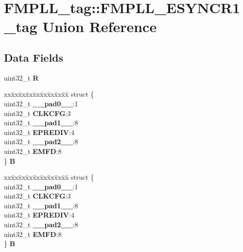\hypertarget{unionFMPLL__tag_1_1FMPLL__ESYNCR1__tag}{}\section{F\+M\+P\+L\+L\+\_\+tag\+::F\+M\+P\+L\+L\+\_\+\+E\+S\+Y\+N\+C\+R1\+\_\+tag Union Reference}
\label{unionFMPLL__tag_1_1FMPLL__ESYNCR1__tag}
\subsection*{Data Fields}
\begin{DoxyCompactItemize}
\item 
\mbox{\label{unionFMPLL__tag_1_1FMPLL__ESYNCR1__tag_ad4d5de477dfd2d4762adf998c3401622}} 
uint32\+\_\+t {\bfseries R}
\item 
\mbox{\label{unionFMPLL__tag_1_1FMPLL__ESYNCR1__tag_a9950e2684cd73183cee74c74d6430e35}} 
\begin{tabbing}
xx\=xx\=xx\=xx\=xx\=xx\=xx\=xx\=xx\=\kill
struct \{\\
\>uint32\_t {\bfseries \_\_pad0\_\_}:1\\
\>uint32\_t {\bfseries CLKCFG}:3\\
\>uint32\_t {\bfseries \_\_pad1\_\_}:8\\
\>uint32\_t {\bfseries EPREDIV}:4\\
\>uint32\_t {\bfseries \_\_pad2\_\_}:8\\
\>uint32\_t {\bfseries EMFD}:8\\
\} {\bfseries B}\\

\end{tabbing}\item 
\mbox{\label{unionFMPLL__tag_1_1FMPLL__ESYNCR1__tag_afdf7cc3e1c4dffbcdd849649b589d417}} 
\begin{tabbing}
xx\=xx\=xx\=xx\=xx\=xx\=xx\=xx\=xx\=\kill
struct \{\\
\>uint32\_t {\bfseries \_\_pad0\_\_}:1\\
\>uint32\_t {\bfseries CLKCFG}:3\\
\>uint32\_t {\bfseries \_\_pad1\_\_}:8\\
\>uint32\_t {\bfseries EPREDIV}:4\\
\>uint32\_t {\bfseries \_\_pad2\_\_}:8\\
\>uint32\_t {\bfseries EMFD}:8\\
\} {\bfseries B}\\


\end{tabbing}
\end{DoxyCompactItemize}
